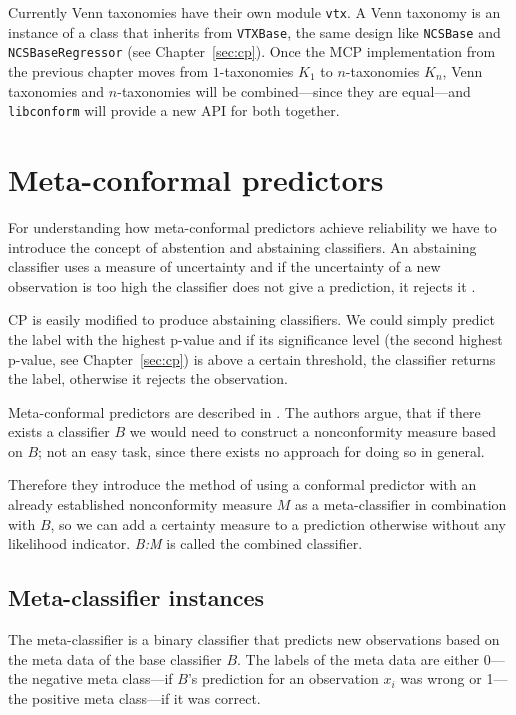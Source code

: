 \documentclass[twoside,11pt]{article}
\def\libconform{\texttt{libconform}}
\begin{document}
Currently Venn taxonomies have their own module
\texttt{vtx}. A Venn taxonomy is an instance of a class
that inherits from \texttt{VTXBase}, the same design
like \texttt{NCSBase} and \texttt{NCSBase\-Re\-gres\-sor}
(see Chapter~\ref{sec:cp}).
Once the MCP implementation from the previous chapter moves
from $1$-taxonomies $K_1$ to $n$-taxonomies $K_n$, Venn
taxonomies and $n$-taxonomies will be combined---since they
are equal---and \libconform{} will provide a new API for
both together.

\section{Meta-conformal predictors}
\label{sec:meta}

For understanding how meta-conformal predictors achieve
reliability we have to introduce the concept of abstention
and abstaining classifiers.
An abstaining classifier uses a measure of uncertainty and
if the uncertainty of a new observation is too high the
classifier does not give a prediction, it rejects it
\citep[see][]{vanderlooy_et_al_2009}.

CP is easily modified to produce abstaining classifiers.
We could simply predict the label with the highest
p-value and if its significance level (the second highest
p-value, see Chapter~\ref{sec:cp}) is above a certain
threshold, the classifier returns the label, otherwise it
rejects the observation.

Meta-conformal predictors are described in
\citet{smirnov_et_al_2009}. The authors argue, that if
there exists a classifier $B$ we would need to construct
a nonconformity measure based on $B$; not an easy task,
since there exists no approach for doing so in general.

Therefore they introduce the method of using a conformal
predictor with an already established nonconformity measure
$M$ as a meta-classifier in combination with $B$, so we can
add a certainty measure to a prediction otherwise without
any likelihood indicator.
\textit{B:M} is called the combined classifier.

\subsection*{Meta-classifier instances}

The meta-classifier is a binary classifier that predicts
new observations based on the meta data of the base
classifier $B$. The labels of the meta data are either
0---the negative meta class---if $B$'s prediction
for an observation $x_i$ was wrong or 1---the positive
meta class---if it was correct.
\end{document}
